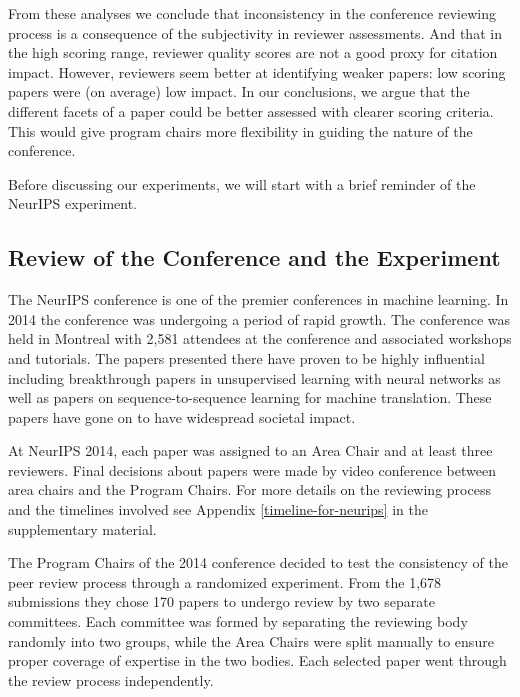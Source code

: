 \documentclass[twoside]{article}
\begin{document}
From these analyses we conclude that inconsistency in the conference
reviewing process is a consequence of the subjectivity in reviewer
assessments. And that in the high scoring range, reviewer quality scores
are not a good proxy for citation impact. However, reviewers seem better
at identifying weaker papers: low scoring papers were (on average) low
impact. In our conclusions, we argue that the different facets of a paper could be better assessed with clearer scoring criteria. This would give program chairs more flexibility in guiding the nature of the conference.

Before discussing our experiments, we will start with a brief
reminder of the NeurIPS experiment.

\hypertarget{review-of-the-conference-and-the-experiment}{%
\subsection{Review of the Conference and the
Experiment}\label{review-of-the-conference-and-the-experiment}}

The NeurIPS conference is one of the premier conferences in machine
learning. In 2014 the conference was undergoing a period of rapid
growth. The conference was held in Montreal with 2,581 attendees at the
conference and associated workshops and tutorials. The papers presented
there have proven to be highly influential including breakthrough papers
in unsupervised learning with neural networks as well as papers on
sequence-to-sequence learning for machine translation. These papers have
gone on to have widespread societal impact.

At NeurIPS 2014, each paper was assigned to an Area Chair and at least
three reviewers. Final decisions about papers were made by video
conference between area chairs and the Program Chairs. For more details
on the reviewing process and the timelines involved see Appendix \ref{timeline-for-neurips} in
the supplementary material.

The Program Chairs of the 2014 conference decided to test the
consistency of the peer review process through a randomized experiment.
From the 1,678 submissions they chose 170 papers to undergo review by
two separate committees. Each committee was formed by separating the
reviewing body randomly into two groups, while the Area Chairs were
split manually to ensure proper coverage of expertise in the two bodies.
Each selected paper went through the review process independently.
\end{document}
